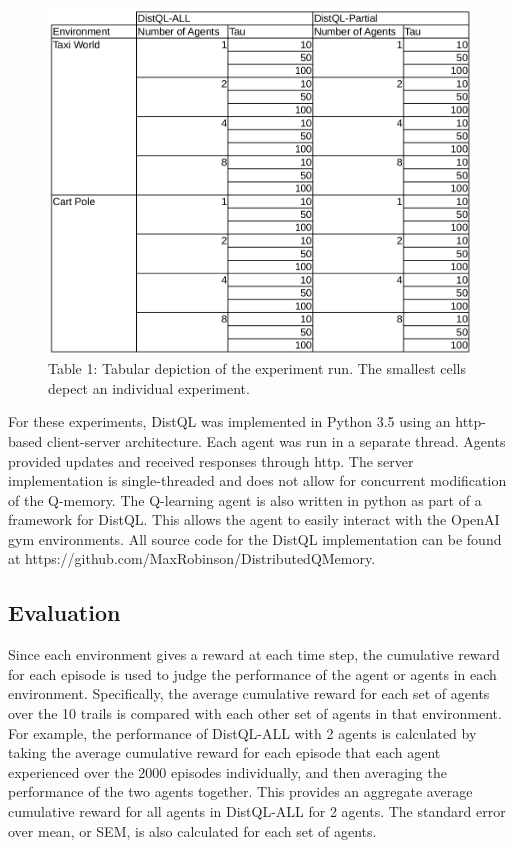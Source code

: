 \documentclass[jair,twoside,11pt,theapa]{article}
\begin{document}
\begin{figure}[h]
\centering
\includegraphics[width=0.7\linewidth]{ExperimentTable}
\caption*{Table 1: Tabular depiction of the experiment run. The smallest cells depect an individual experiment. }
\label{fig:ExperimentTable}
\end{figure}

For these experiments, DistQL was implemented in Python 3.5 using an http-based client-server architecture. Each agent was run in a separate thread. Agents provided updates and received responses through http. The server implementation is single-threaded and does not allow for concurrent modification of the Q-memory. The Q-learning agent is also written in python as part of a framework for DistQL. This allows the agent to easily interact with the OpenAI gym environments. All source code for the DistQL implementation can be found at https://github.com/MaxRobinson/DistributedQMemory.

\subsection{Evaluation} 
\label{evaluation}
Since each environment gives a reward at each time step, the cumulative reward for each episode is used to judge the performance of the agent or agents in each environment. Specifically, the average cumulative reward for each set of agents over the 10 trails is compared with each other set of agents in that environment. For example, the performance of DistQL-ALL with 2 agents is calculated by taking the average cumulative reward for each episode that each agent experienced over the 2000 episodes individually, and then averaging the performance of the two agents together. This provides an aggregate average cumulative reward for all agents in DistQL-ALL for 2 agents. The standard error over mean, or SEM, is also calculated for each set of agents.
\end{document}
